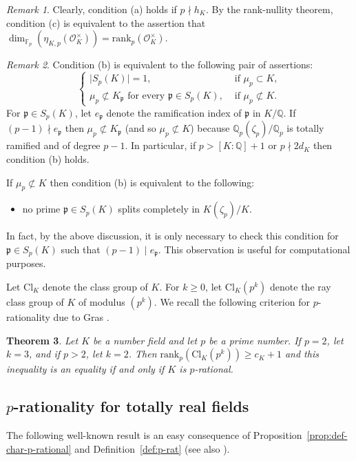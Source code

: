 \documentclass[12pt, a4paper, usenames]{amsart}
\newcommand{\Q}{\mathbb{Q}}
\newcommand{\F}{\mathbb{F}}
\theoremstyle{plain}
\newtheorem{theorem}{Theorem}[section]
\theoremstyle{remark}
\newtheorem{remark}[theorem]{Remark}
\theoremstyle{definition}
\newcommand{\rank}{\mathrm{rank}}
\newcommand{\Cl}{\mathrm{Cl}}
\begin{document}
\begin{remark}
Clearly, condition (a) holds if $p \nmid h_{K}$.
By the rank-nullity theorem, condition (c) is equivalent to the assertion
that 
$\dim_{\F_{p}}(\eta_{K,p}(\mathcal{O}_{K}^{\times}))
=\rank_{p}(\mathcal{O}_{K}^{\times})$.
\end{remark}

\begin{remark}\label{rmk:roots-of-unity-condition}
Condition (b) is equivalent to the following pair of assertions:
\[
\begin{cases}
\lvert S_{p}(K) \rvert =1, & \text{ if } \mu_{p} \subset K,  \\
\mu_{p} \not \subset K_{\mathfrak{p}} \text{ for every } \mathfrak{p} \in S_{p}(K),
& \text{ if } \mu_{p} \not \subset K.
\end{cases}
\]
For $\mathfrak{p} \in S_{p}(K)$, let $e_{\mathfrak{p}}$ denote the
ramification index of $\mathfrak{p}$ in $K/\Q$.
If $(p-1) \nmid e_{\mathfrak{p}}$ then $\mu_{p} \not \subset K_{\mathfrak{p}}$ 
(and so $\mu_{p} \not \subset K$) because 
$\Q_{p}(\zeta_{p})/\Q_{p}$ is totally ramified and of degree $p-1$.
In particular, if $p>[K:\Q]+1$ or $p \nmid 2d_{K}$ then condition (b) holds.

If $\mu_{p} \not \subset K$ then condition (b) is equivalent to the following:
\begin{itemize}
    \item no prime $\mathfrak{p} \in S_{p}(K)$ splits completely in $K(\zeta_{p})/K$.
\end{itemize}
In fact, by the above discussion, it is only necessary to check this
condition for $\mathfrak{p} \in S_{p}(K)$ such that $(p-1) \mid e_{\mathfrak{p}}$.
This observation is useful for computational purposes.
\end{remark}

Let $\Cl_{K}$ denote the class group of $K$.
For $k \geq 0$, let $\Cl_{K}(p^{k})$ denote the ray class group
of $K$ of modulus $(p^{k})$.
We recall the following criterion for $p$-rationality due to Gras \cite[\S 2.1]{MR4491965}.

\begin{theorem}\label{thm:Gras-ray-p-rat}
Let $K$ be a number field and let $p$ be a prime number. 
If $p=2$, let $k=3$, and if $p>2$, let $k=2$.
Then $\rank_{p}(\Cl_{K}(p^{k})) \geq c_{K}+1$
and this inequality is an equality if and only if $K$ is $p$-rational.
\end{theorem}


\subsection{$p$-rationality for totally real fields}\label{subsec:p-rat-tot-real}
The following well-known result is an easy consequence of 
Proposition~\ref{prop:def-char-p-rational} and Definition~\ref{def:p-rat}
(see also \cite[\S 3]{MR3512524}).
\end{document}
